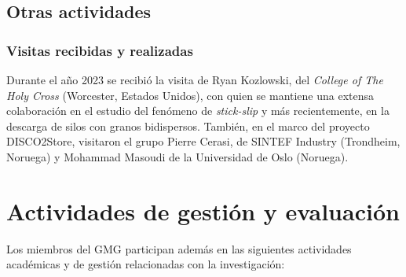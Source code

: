 \documentclass[a4paper,11pt,twoside,final,titlepage,onecolumn,openright]{report}
\begin{document}
\subsection{Otras actividades}

\subsubsection{Visitas recibidas y realizadas}

Durante el año 2023 se recibió la visita de Ryan Kozlowski, del \textit{College of The Holy Cross} (Worcester, Estados Unidos), con quien se mantiene una extensa colaboración en el estudio del fenómeno de \textit{stick-slip} y más recientemente, en la descarga de silos con granos bidispersos. También, en el marco del proyecto DISCO2Store, visitaron el grupo Pierre Cerasi, de SINTEF Industry (Trondheim, Noruega) y Mohammad Masoudi de la Universidad de Oslo (Noruega).

% 
% 
% 
%  

\section{Actividades de gestión y evaluación}

Los miembros del GMG participan además en las siguientes actividades académicas y de gestión relacionadas con la investigación:
\end{document}
